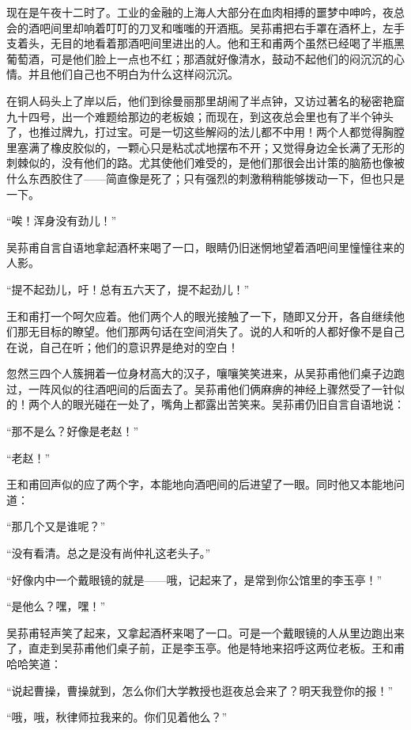 \par 现在是午夜十二时了。工业的金融的上海人大部分在血肉相搏的噩梦中呻吟，夜总会的酒吧间里却响着叮叮的刀叉和嗤嗤的开酒瓶。吴荪甫把右手罩在酒杯上，左手支着头，无目的地看着那酒吧间里进出的人。他和王和甫两个虽然已经喝了半瓶黑葡萄酒，可是他们脸上一点也不红；那酒就好像清水，鼓动不起他们的闷沉沉的心情。并且他们自己也不明白为什么这样闷沉沉。
\par 在铜人码头上了岸以后，他们到徐曼丽那里胡闹了半点钟，又访过著名的秘密艳窟九十四号，出一个难题给那边的老板娘；而现在，到这夜总会里也有了半个钟头了，也推过牌九，打过宝。可是一切这些解闷的法儿都不中用！两个人都觉得胸膛里塞满了橡皮胶似的，一颗心只是粘忒忒地摆布不开；又觉得身边全长满了无形的刺棘似的，没有他们的路。尤其使他们难受的，是他们那很会出计策的脑筋也像被什么东西胶住了——简直像是死了；只有强烈的刺激稍稍能够拨动一下，但也只是一下。
\par “唉！浑身没有劲儿！”
\par 吴荪甫自言自语地拿起酒杯来喝了一口，眼睛仍旧迷惘地望着酒吧间里憧憧往来的人影。
\par “提不起劲儿，吁！总有五六天了，提不起劲儿！”
\par 王和甫打一个呵欠应着。他们两个人的眼光接触了一下，随即又分开，各自继续他们那无目标的瞭望。他们那两句话在空间消失了。说的人和听的人都好像不是自己在说，自己在听；他们的意识界是绝对的空白！
\par 忽然三四个人簇拥着一位身材高大的汉子，嚷嚷笑笑进来，从吴荪甫他们桌子边跑过，一阵风似的往酒吧间的后面去了。吴荪甫他们俩麻痹的神经上骤然受了一针似的！两个人的眼光碰在一处了，嘴角上都露出苦笑来。吴荪甫仍旧自言自语地说：
\par “那不是么？好像是老赵！”
\par “老赵！”
\par 王和甫回声似的应了两个字，本能地向酒吧间的后进望了一眼。同时他又本能地问道：
\par “那几个又是谁呢？”
\par “没有看清。总之是没有尚仲礼这老头子。”
\par “好像内中一个戴眼镜的就是——哦，记起来了，是常到你公馆里的李玉亭！”
\par “是他么？嘿，嘿！”
\par 吴荪甫轻声笑了起来，又拿起酒杯来喝了一口。可是一个戴眼镜的人从里边跑出来了，直走到吴荪甫他们桌子前，正是李玉亭。他是特地来招呼这两位老板。王和甫哈哈笑道：
\par “说起曹操，曹操就到，怎么你们大学教授也逛夜总会来了？明天我登你的报！”
\par “哦，哦，秋律师拉我来的。你们见着他么？”
